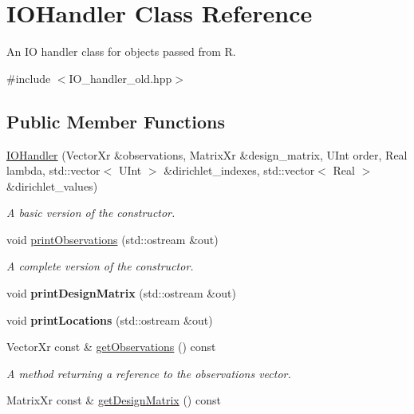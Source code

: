 \hypertarget{classIOHandler}{
\section{IOHandler Class Reference}
\label{classIOHandler}
}


An IO handler class for objects passed from R.  


{\ttfamily \#include $<$IO\_\-handler\_\-old.hpp$>$}\subsection*{Public Member Functions}
\begin{DoxyCompactItemize}
\item 
\hyperlink{classIOHandler_ab29ae5702f6c5238cc0e33a84625e709}{IOHandler} (VectorXr \&observations, MatrixXr \&design\_\-matrix, UInt order, Real lambda, std::vector$<$ UInt $>$ \&dirichlet\_\-indexes, std::vector$<$ Real $>$ \&dirichlet\_\-values)
\begin{DoxyCompactList}\small\item\em A basic version of the constructor. \item\end{DoxyCompactList}\item 
void \hyperlink{classIOHandler_ae1902fae16f3d44a15b76e175d2a7299}{printObservations} (std::ostream \&out)
\begin{DoxyCompactList}\small\item\em A complete version of the constructor. \item\end{DoxyCompactList}\item 
\hypertarget{classIOHandler_a181d9429c3de322d9b3782af0fdc2a2a}{
void {\bfseries printDesignMatrix} (std::ostream \&out)}
\label{classIOHandler_a181d9429c3de322d9b3782af0fdc2a2a}

\item 
\hypertarget{classIOHandler_a6e7ae9ae99f678c01e9c64dc1beda12a}{
void {\bfseries printLocations} (std::ostream \&out)}
\label{classIOHandler_a6e7ae9ae99f678c01e9c64dc1beda12a}

\item 
\hypertarget{classIOHandler_ae4519801e2879296dd3c906edb18afbd}{
VectorXr const \& \hyperlink{classIOHandler_ae4519801e2879296dd3c906edb18afbd}{getObservations} () const }
\label{classIOHandler_ae4519801e2879296dd3c906edb18afbd}

\begin{DoxyCompactList}\small\item\em A method returning a reference to the observations vector. \item\end{DoxyCompactList}\item 
\hypertarget{classIOHandler_a3dce10d31729949d19f234ea57a01844}{
MatrixXr const \& \hyperlink{classIOHandler_a3dce10d31729949d19f234ea57a01844}{getDesignMatrix} () const }
\label{classIOHandler_a3dce10d31729949d19f234ea57a01844}


\end{DoxyCompactItemize}
